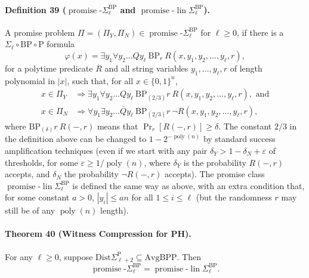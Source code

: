 \documentclass[10pt,a4paper]{article}
\begin{document}
\paragraph{Definition 39 ($\operatorname{promise}\text{-}\Sigma_\ell^{\mathrm{BP}}$ and $\operatorname{promise}\text{-}\operatorname{lin}\Sigma_\ell^{\mathrm{BP}}$).} A promise problem $\Pi=(\Pi_Y,\Pi_N)\in\operatorname{promise}\text{-}\Sigma_\ell^{\mathrm{BP}}$ for $\ell\geq0$, if there is a $\Sigma_\ell\circ\mathrm{BP}\circ\mathrm P$ formula
\[\varphi(x)=\exists y_1\forall y_2\ldots Qy_\ell\ \mathrm{BP}_r\ R(x,y_1,y_2,\ldots,y_\ell,r),\]
for a polytime predicate $R$ and all string variables $y_1,\ldots,y_\ell,r$ of length polynomial in $|x|$, such that, for all $x\in\{0,1\}^n$,
\begin{align*}
x\in\Pi_Y&\Longrightarrow\exists y_1\forall y_2\ldots Qy_\ell\ \mathrm{BP}_{(2/3)}r\ R(x,y_1,y_2,\ldots,y_\ell,r),\text{ and}\\
x\in\Pi_N&\Longrightarrow\forall y_1\exists y_2\ldots\overline Qy_\ell\ \mathrm{BP}_{(2/3)}r\ \neg R(x,y_1,y_2,\ldots,y_\ell,r),
\end{align*}
where $\mathrm{BP}_{(\delta)}r\ R(-,r)$ means that $\Pr_r[R(-,r)]\geq\delta$. The constant $2/3$ in the definition above can be changed to $1-2^{-\operatorname{poly}(n)}$ by standard success amplification techniques (even if we start with any pair $\delta_Y>1-\delta_N+\varepsilon$ of thresholds, for some $\varepsilon\geq1/\operatorname{poly}(n)$, where $\delta_Y$ is the probability $R(-,r)$ accepts, and $\delta_N$ the probability $\neg R(-,r)$ accepts).
The promise class $\operatorname{promise}\text{-}\operatorname{lin}\Sigma_\ell^{\mathrm{BP}}$ is defined the same way as above, with an extra condition that, for some constant $a>0$, $|y_i|\leq an$ for all $1\leq i\leq\ell$ (but the randomness $r$ may still be of any $\operatorname{poly}(n)$ length).
\paragraph{Theorem 40 (Witness Compression for PH).} For any $\ell\geq0$, suppose $\mathrm{Dist}\Sigma_{\ell+2}^{\mathrm P}\subseteq\mathrm{AvgBPP}$. Then
\[\operatorname{promise}\text{-}\Sigma_\ell^{\mathrm{BP}}=\operatorname{promise}\text{-}\operatorname{lin}\Sigma_\ell^{\mathrm{BP}}.\]
\end{document}
